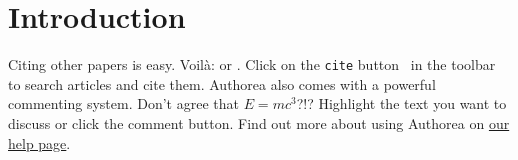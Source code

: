 \section{Introduction}

Citing other papers is easy. Voilà: \cite{2012} or \cite{Holstein_2009}. Click on the \verb|cite| button~\cite{Szpyrka_2013} in the toolbar to search articles and cite them. Authorea also comes with a powerful commenting system. Don't agree that $E  =  mc^{3}$?!? Highlight the text you want to discuss or click the comment button. Find out more about using Authorea on \href{https://www.authorea.com/help}{our help page}.